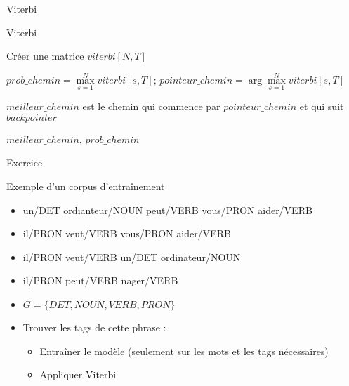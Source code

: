 \documentclass{KodeBook}
\begin{document}
Viterbi
\begin{block}{Viterbi }
	\scriptsize
	\begin{algorithm}[H]
		
		Créer une matrice $viterbi[N, T]$\;
		
		
		
		$prob\_chemin = \max\limits_{s=1}^N viterbi[s, T];\, pointeur\_chemin = \arg\max\limits_{s=1}^N viterbi[s, T]$\;
		
		$meilleur\_chemin$ est le chemin qui commence par $pointeur\_chemin$ et qui suit $backpointer$
		
		\Return $meilleur\_chemin$, $prob\_chemin$\;
		
	\end{algorithm}
\end{block}

Exercice

\begin{exampleblock}{Exemple d'un corpus d'entraînement}
	\begin{itemize}
		\item un/DET ordianteur/NOUN peut/VERB vous/PRON aider/VERB
		\item il/PRON veut/VERB vous/PRON aider/VERB
		\item il/PRON veut/VERB un/DET ordinateur/NOUN
		\item il/PRON peut/VERB nager/VERB
	\end{itemize}
\end{exampleblock}

\begin{itemize}
	\item $G = \{DET, NOUN, VERB, PRON\}$
	\item Trouver les tags de cette phrase : 
	\begin{itemize}
		\item Entraîner le modèle (seulement sur les mots et les tags nécessaires)
		\item Appliquer Viterbi
	\end{itemize}
\end{itemize}
\end{document}
